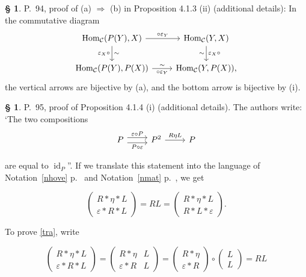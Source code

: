 \documentclass[12pt]{article}%
\theoremstyle{remark}
\theoremstyle{definition}
\newtheorem{s}[thm]{\S}%
\newcommand{\nn}{\noindent}
\newcommand{\C}{\mathcal C}
\newcommand{\ee}{\varepsilon}
\newcommand{\then}{\Rightarrow}
\DeclareMathOperator{\id}{id}
\DeclareMathOperator{\Hom}{Hom}%
\begin{document}
%

\begin{s} 
P.~94, proof of (a) $\then$ (b) in Proposition 4.1.3 (ii) (additional details): In the commutative diagram 
$$
\begin{tikzcd}
\Hom_\C(P(Y),X)\ar{d}{\sim}[swap]{\varepsilon_X\circ}\ar{r}{\circ\varepsilon_Y}&\Hom_\C(Y,X)\ar{d}{\varepsilon_X\circ}[swap]{\sim}\\ 
\Hom_\C(P(Y),P(X))\ar{r}[swap]{\circ\varepsilon_Y}{\sim}&\Hom_\C(Y,P(X)),
\end{tikzcd}
$$ 
the vertical arrows are bijective by (a), and the bottom arrow is bijective by (i).
\end{s}


\begin{s} 
P.~95, proof of Proposition 4.1.4 (i) (additional details). The authors write: `The two compositions 
$$
\begin{tikzcd}
P\ar[yshift=0.7ex]{r}{\ee\circ P}\ar[yshift=-0.7ex]{r}[swap]{P\circ\ee}&P^2\ar{r}{R\eta L}&P
\end{tikzcd}
$$ 

\nn are equal to $\id_P$''. If we translate this statement into the language of Notation~\ref{nhove} p.~\pageref{nhove} and Notation~\ref{nmat} p.~\pageref{nmat}, we get 

\begin{equation}\label{tra}
\begin{pmatrix}R*\eta*L\\ \ee*R*L\end{pmatrix}
=RL=\begin{pmatrix}R*\eta*L\\ R*L*\ee\end{pmatrix}.
\end{equation}

\nn To prove \eqref{tra}, write 

$$
\begin{pmatrix}R*\eta*L\\ \ee*R*L\end{pmatrix}
=\begin{pmatrix}R*\eta&L\\ \ee*R&L\end{pmatrix}
=\begin{pmatrix}R*\eta\\ \ee*R\end{pmatrix}\circ\begin{pmatrix}L\\ L\end{pmatrix}
=RL
$$


\end{s}
\end{document}
